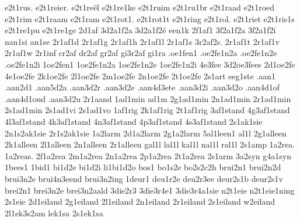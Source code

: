 {%
e2t1rus.
e2t1reier.
e2t1reël
e2t1re1ke
e2t1ruim
e2t1ru1br
e2t1raad
e2t1roed
e2t1rim
e2t1raam
e2t1ram
e2t1rot1.
e2t1rot1t
e2t1ring
e2t1rol.
e2t1riet
e2t1ris1s
e2t1re1pu
e2t1re1ge
%
%
%
%
2d1af
3d2a1f2a
3d2a1f2é
%
een1k
%
2f1af1
3f2a1f2a
3f2a1f2i
%
nan1si
an1se
%
2r1af1d
2r1af1g
2r1af1h
2r1af1l
2r1af1s
3r2af2s.
2r1af1t
2r1af1v
2r1af1w
%
2r1inf
%
cr2af
dr2af
gr2af
gi3r2af
gi1ra
%
.oe1fen1
.oe2fe1n2a
.oe2fe1n2e
.oe2fe1n2i
1oe2fen1
1oe2fe1n2a
1oe2fe1n2e
1oe2fe1n2i
4e3fee
3d2oe3fees
2d1oe2fe
4e1oe2fe
2k1oe2fe
2l1oe2fe
2m1oe2fe
2n1oe2fe
2t1oe2fe
%
%
%
2s1art
%
eeg1ste
%
%
%
.aan1
.aan2d1
.aan5d2a
.aan3d2r
.aan3d2e
.aan4d3ete
.aan3d2i
.aan3d2o
.aan4d1of
.aan4d1oud
.aan3d2u
2r1aand
%
1ad1min
ad1m
2g1ad1min
2n1ad1min
2r1ad1min
2s1ad1min
%
2s1ad1vi
2s1ad1vo
%
1af1rig
2k1af1rig
2t1af1rig
%
3af1stand
4g3af1stand
4l3af1stand
4k3af1stand
4n3af1stand
4p3af1stand
4s3af1stand
%
2s1ak1sie
2n1s2ak1sie
2r1s2ak1sie
%
1a2larm
2d1a2larm
2g1a2larm
%
5al1leen1
al1l
2g1alleen
2k1alleen
2l1alleen
2n1alleen
2r1alleen
gal1l
lal1l
kal1l
nal1l
ral1l
%
%
2s1amp
%
1a2rea.
1a2reas.
2f1a2rea
2m1a2rea
2n1a2rea
2p1a2rea
2t1a2rea
%
2s1arm
%
3a2syn
g4a1syn
%
1bees1
%
1bid1
bi1d2e
bi1d2i
li1bi1d2o
%
bos1
bo1s2e
bo2s2c2h
%
brui2n1
brui2n2d
brui3n2e
brui4n3eend
brui3n2ing
%
1deur1
deu1r2e
deu2r3ee
deur2s1b
deur2s1v
%
brei2n1
brei3n2e
brei3n2aald
%
3die2r3
3die3r4e1
3die3r4a1sie
%
n2t1eie
n2t1eie1ning
2s1eie
%
2d1eiland
2g1eiland
2l1eiland
2n1eiland
2r1eiland
2s1eiland
w2eiland
%
2l1ek3s2am
lek1sa
2s1ek1sa
%
}
